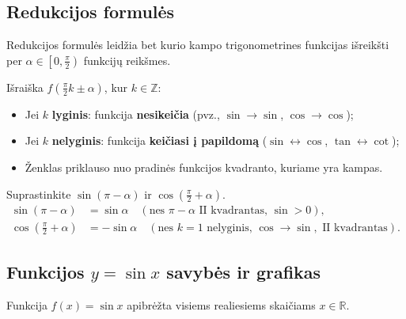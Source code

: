 \subsection{Redukcijos formulės}

Redukcijos formulės leidžia bet kurio kampo trigonometrines funkcijas išreikšti per \(\alpha \in \left[0, \frac{\pi}{2}\right)\) funkcijų reikšmes.

\begin{theorem}
Išraiška \(f\!\left(\frac{\pi}{2} k \pm \alpha\right)\), kur \(k \in \mathbb{Z}\):
\begin{itemize}
    \item Jei \(k\) \textbf{lyginis}: funkcija \textbf{nesikeičia} (pvz., \(\sin \to \sin\), \(\cos \to \cos\));
    \item Jei \(k\) \textbf{nelyginis}: funkcija \textbf{keičiasi į papildomą} (\(\sin \leftrightarrow \cos\), \(\tan \leftrightarrow \cot\));
    \item Ženklas priklauso nuo pradinės funkcijos kvadranto, kuriame yra kampas.
\end{itemize}
\end{theorem}

\begin{example}
Suprastinkite \(\sin\!\left(\pi - \alpha\right)\) ir \(\cos\!\left(\frac{\pi}{2} + \alpha\right)\).
\begin{align*}
\sin(\pi - \alpha) &= \sin\alpha \quad (\text{nes } \pi - \alpha \text{ II kvadrantas, } \sin > 0),\\
\cos\!\left(\tfrac{\pi}{2} + \alpha\right) &= -\sin\alpha \quad (\text{nes } k=1 \text{ nelyginis, } \cos\to\sin,\text{ II kvadrantas}).
\end{align*}
\end{example}

\subsection{Funkcijos \texorpdfstring{\(y = \sin x\)}{y = sin x} savybės ir grafikas}

\begin{definition}
Funkcija \(f(x) = \sin x\) apibrėžta visiems realiesiems skaičiams \(x \in \mathbb{R}\).
\end{definition}

